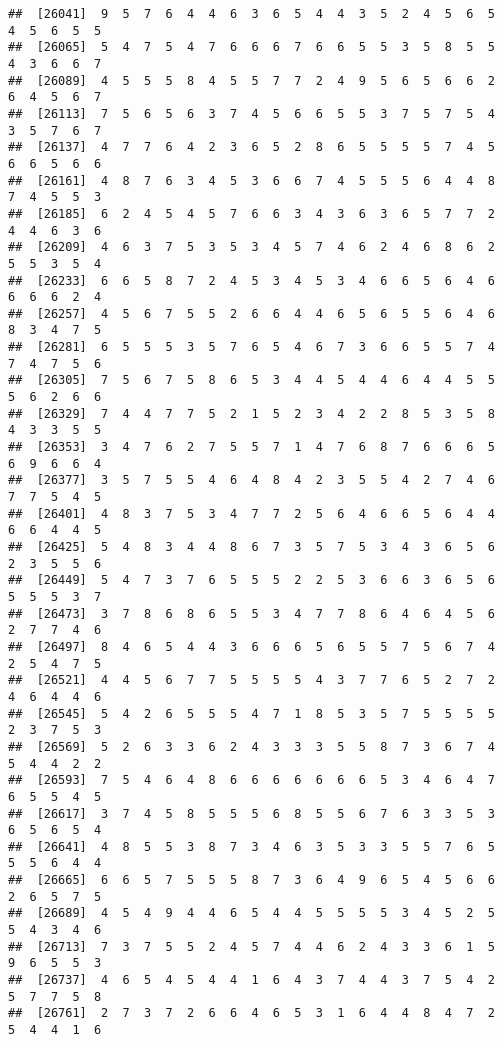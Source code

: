 \documentclass[
]{book}
\begin{document}
\begin{verbatim}
##  [26041]  9  5  7  6  4  4  6  3  6  5  4  4  3  5  2  4  5  6  5  4  5  6  5  5
##  [26065]  5  4  7  5  4  7  6  6  6  7  6  6  5  5  3  5  8  5  5  4  3  6  6  7
##  [26089]  4  5  5  5  8  4  5  5  7  7  2  4  9  5  6  5  6  6  2  6  4  5  6  7
##  [26113]  7  5  6  5  6  3  7  4  5  6  6  5  5  3  7  5  7  5  4  3  5  7  6  7
##  [26137]  4  7  7  6  4  2  3  6  5  2  8  6  5  5  5  5  7  4  5  6  6  5  6  6
##  [26161]  4  8  7  6  3  4  5  3  6  6  7  4  5  5  5  6  4  4  8  7  4  5  5  3
##  [26185]  6  2  4  5  4  5  7  6  6  3  4  3  6  3  6  5  7  7  2  4  4  6  3  6
##  [26209]  4  6  3  7  5  3  5  3  4  5  7  4  6  2  4  6  8  6  2  5  5  3  5  4
##  [26233]  6  6  5  8  7  2  4  5  3  4  5  3  4  6  6  5  6  4  6  6  6  6  2  4
##  [26257]  4  5  6  7  5  5  2  6  6  4  4  6  5  6  5  5  6  4  6  8  3  4  7  5
##  [26281]  6  5  5  5  3  5  7  6  5  4  6  7  3  6  6  5  5  7  4  7  4  7  5  6
##  [26305]  7  5  6  7  5  8  6  5  3  4  4  5  4  4  6  4  4  5  5  5  6  2  6  6
##  [26329]  7  4  4  7  7  5  2  1  5  2  3  4  2  2  8  5  3  5  8  4  3  3  5  5
##  [26353]  3  4  7  6  2  7  5  5  7  1  4  7  6  8  7  6  6  6  5  6  9  6  6  4
##  [26377]  3  5  7  5  5  4  6  4  8  4  2  3  5  5  4  2  7  4  6  7  7  5  4  5
##  [26401]  4  8  3  7  5  3  4  7  7  2  5  6  4  6  6  5  6  4  4  6  6  4  4  5
##  [26425]  5  4  8  3  4  4  8  6  7  3  5  7  5  3  4  3  6  5  6  2  3  5  5  6
##  [26449]  5  4  7  3  7  6  5  5  5  2  2  5  3  6  6  3  6  5  6  5  5  5  3  7
##  [26473]  3  7  8  6  8  6  5  5  3  4  7  7  8  6  4  6  4  5  6  2  7  7  4  6
##  [26497]  8  4  6  5  4  4  3  6  6  6  5  6  5  5  7  5  6  7  4  2  5  4  7  5
##  [26521]  4  4  5  6  7  7  5  5  5  5  4  3  7  7  6  5  2  7  2  4  6  4  4  6
##  [26545]  5  4  2  6  5  5  5  4  7  1  8  5  3  5  7  5  5  5  5  2  3  7  5  3
##  [26569]  5  2  6  3  3  6  2  4  3  3  3  5  5  8  7  3  6  7  4  5  4  4  2  2
##  [26593]  7  5  4  6  4  8  6  6  6  6  6  6  6  5  3  4  6  4  7  6  5  5  4  5
##  [26617]  3  7  4  5  8  5  5  5  6  8  5  5  6  7  6  3  3  5  3  6  5  6  5  4
##  [26641]  4  8  5  5  3  8  7  3  4  6  3  5  3  3  5  5  7  6  5  5  5  6  4  4
##  [26665]  6  6  5  7  5  5  5  8  7  3  6  4  9  6  5  4  5  6  6  2  6  5  7  5
##  [26689]  4  5  4  9  4  4  6  5  4  4  5  5  5  5  3  4  5  2  5  5  4  3  4  6
##  [26713]  7  3  7  5  5  2  4  5  7  4  4  6  2  4  3  3  6  1  5  9  6  5  5  3
##  [26737]  4  6  5  4  5  4  4  1  6  4  3  7  4  4  3  7  5  4  2  5  7  7  5  8
##  [26761]  2  7  3  7  2  6  6  4  6  5  3  1  6  4  4  8  4  7  2  5  4  4  1  6

\end{verbatim}
\end{document}
